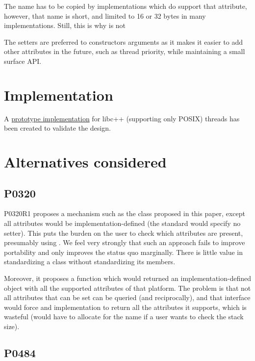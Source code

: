 \documentclass{wg21}
\begin{document}
The name has to be copied by implementations which do support that attribute, however, that name is short,
and limited to 16 or 32 bytes in many implementations.
Still, this is why  is not 

The setters are preferred to constructors arguments as it makes it easier to add other attributes in the
future, such as thread priority, while maintaining a small surface API.

\section{Implementation}

A \href{https://github.com/cor3ntin/llvm-project/tree/thread_name}{prototype implementation} for libc++ (supporting only POSIX) threads has been created to validate the design.

\section{Alternatives considered}

\subsection{P0320 \cite{P0320R1}}

P0320R1 proposes a mechanism such as the  class proposed in this paper, except
all attributes would be implementation-defined (the standard would specify no setter).
This puts the burden on the user to check which attributes are present, presumably using .
We feel very strongly that such an approach fails to improve portability and only improves the status quo marginally.
There is little value in standardizing a class without standardizing its members.

Moreover, it proposes a  function which would returned an implementation-defined object
with all the supported attributes of that platform.
The problem is that not all attributes that can be set can be queried (and reciprocally), and that interface would force
and implementation to return all the attributes it supports, which is wasteful (would have to allocate for the name if a user wants to check the stack size).

\subsection{P0484 \cite{P0484R1}}
\end{document}

